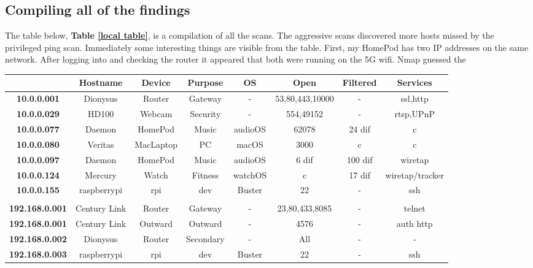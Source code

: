 \documentclass[10pt]{article}
\begin{document}
\subsection*{Compiling all of the findings}
The table below, \textbf{Table \ref{local table}}, is a compilation of all the scans. The aggressive scans discovered more hosts missed by the privileged ping scan.
Immediately some interesting things are visible from the table. First, my HomePod has two IP addresses on the same network. After logging into and checking the router
it appeared that both were running on the 5G wifi. Nmap guessed the 

\begin{table}[H]
  \begin{center}
  \begin{tabular}{ | c | c | c | c | c | c | c | c | } 
  \hline
   & \textbf{Hostname} & \textbf{Device} & \textbf{Purpose} & \textbf{OS} & \textbf{Open} & \textbf{Filtered}  & \textbf{Services}  \\  
   \hline
   \textbf{10.0.0.001} & Dionysus & Router & Gateway & - & 53,80,443,10000 & - & ssl,http \\  
   \hline
   \textbf{10.0.0.029}  & HD100 & Webcam & Security & - & 554,49152 & - & rtsp,UPnP \\  
   \hline
   \textbf{10.0.0.077}  & Daemon & HomePod & Music & audioOS & 62078 & 24 dif & c\\  
   \hline
   \textbf{10.0.0.080}  & Veritas & MacLaptop & PC & macOS & 3000 & c & c \\  
   \hline
   \textbf{10.0.0.097}  & Daemon & HomePod & Music & audioOS & 6 dif & 100 dif & wiretap \\  
   \hline
   \textbf{10.0.0.124}  & Mercury & Watch & Fitness & watchOS & c & 17 dif & wiretap/tracker \\  
   \hline
   \textbf{10.0.0.155}  & raspberrypi & rpi & dev & Buster & 22 & - & ssh \\  
   \hline
   \textbf{}  &  &  &   &  &  &  & \\  
   \hline
   \textbf{192.168.0.001}  & Century Link & Router & Gateway & - & 23,80,433,8085 & - & telnet\\  
   \hline
   \textbf{192.168.0.001}  & Century Link & Outward & Outward & - & 4576 & - & auth http\\  
   \hline
   \textbf{192.168.0.002}  & Dionysus & Router & Secondary & - & All & - & - \\  
   \hline
   \textbf{192.168.0.003}  & raspberrypi & rpi & dev & Buster & 22 & - & ssh \\  

\end{tabular}
\end{center}
\end{table}
\end{document}
